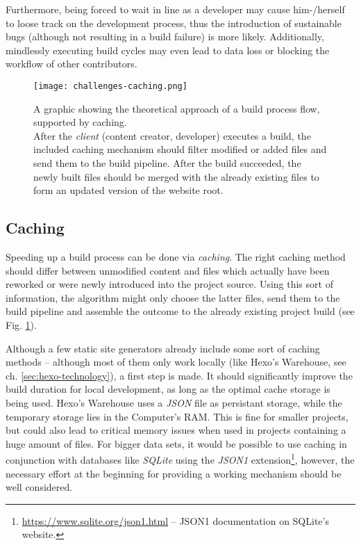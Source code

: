 Furthermore, being forced to wait in line as a developer may cause him-/herself to loose track on the development process, thus the introduction of sustainable bugs (although not resulting in a build failure) is more likely. Additionally, mindlessly executing build cycles may even lead to data loss or blocking the workflow of other contributors.

\begin{figure} %
    \centering
    \texttt{[image: challenges-caching.png]}
    \caption{A graphic showing the theoretical approach of a build process flow, supported by caching.\\
    After the \emph{client} (content creator, developer) executes a build, the included caching mechanism should filter modified or added files and send them to the build pipeline. After the build succeeded, the newly built files should be merged with the already existing files to form an updated version of the website root.}
    \label{fig:caching}
\end{figure}
%

\subsection{Caching}
\label{sec:challenges-caching}
Speeding up a build process can be done via \emph{caching}. The right caching method should differ between unmodified content and files which actually have been reworked or were newly introduced into the project source. Using this sort of information, the algorithm might only choose the latter files, send them to the build pipeline and assemble the outcome to the already existing project build (see Fig. \ref{fig:caching}).

Although a few static site generators already include some sort of caching methods -- although most of them only work locally (like Hexo's Warehouse, see ch. \ref{sec:hexo-technology}), a first step is made. It should significantly improve the build duration for local development, as long as the optimal cache storage is being used. Hexo's Warehouse uses a \emph{JSON} file as persistant storage, while the temporary storage lies in the Computer's RAM. This is fine for smaller projects, but could also lead to critical memory issues when used in projects containing a huge amount of files. For bigger data sets, it would be possible to use caching in conjunction with databases like \emph{SQLite} using the \emph{JSON1} extension\footnote{\url{https://www.sqlite.org/json1.html} -- JSON1 documentation on SQLite's website.}, however, the necessary effort at the beginning for providing a working mechanism should be well considered.

